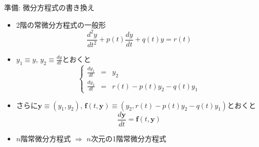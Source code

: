 \begin{frame}[t,fragile]{準備: 微分方程式の書き換え}
  \begin{itemize}
  \item 2階の常微分方程式の一般形
    \[
    \frac{d^2y}{dt^2} + p(t)\frac{dy}{dt} + q(t)y = r(t)
    \]
  \item $y_1 \equiv y$, $y_2 \equiv \frac{dy}{dt}$とおくと
    \[
    \left\{
    \begin{array}{ccl}
      \frac{dy_1}{dt} & = & y_2 \\
      \frac{dy_2}{dt} & = & r(t) - p(t) y_2 - q(t) y_1
    \end{array}
    \right.
    \]
  \item さらに$\bm{y}\equiv(y_1, y_2)$, $\bm{f}(t, \bm{y})\equiv \left(y_2, r(t)-p(t)y_2 - q(t)y_1\right)$とおくと
    \[
    \frac{d\bm{y}}{dt} = \bm{f}(t, \bm{y})
    \]
  \item $n$階常微分方程式 $\Rightarrow$ $n$次元の1階常微分方程式
  \end{itemize}
\end{frame}
